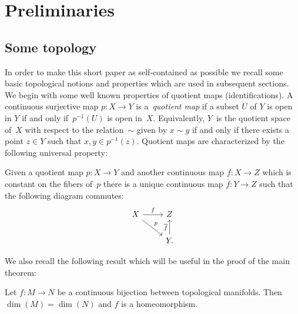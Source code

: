 \section{Preliminaries}
\subsection{Some topology}
In order to make this short paper as self-contained as possible we recall some basic topological notions and properties which are used in subsequent sections. We begin with some well known properties of quotient maps (identifications). A continuous surjective map $p\colon X\rightarrow Y$ is a~\emph{quotient map} if a subset $U$ of $Y$ is open in $Y$ if and only if~$p^{-1}(U)$ is open in~$X$. Equivalently, $Y$~is the quotient space of~$X$ with respect to the relation~$\sim$ given by $x\sim y$ if and only if there exists a point $z\in Y$ such that $x,y\in p^{-1}(z)$. Quotient maps are characterized by the following universal property:
\begin{prop}\label{PtQ} Given a quotient map $p\colon X\rightarrow Y$ and another continuous map $f\colon X\rightarrow Z$ which is constant on the fibers of~$p$ there is a unique continuous map $\overline{f}\colon Y\rightarrow Z$ such that the following diagram commutes:
\begin{equation*}
\begin{tikzcd}
X \arrow[rd, "p"] \arrow[r, "f"] & Z \\
& Y.\arrow[u, "\overline{f}"]
\end{tikzcd}
\end{equation*}
\end{prop}
We also recall the following result which will be useful in the proof of the main theorem:
\begin{tw}\label{MH} Let $f\colon M\rightarrow N$ be a continuous bijection between topological manifolds. Then $\dim(M)=\dim(N)$ and $f$ is a homeomorphism.
\end{tw}

